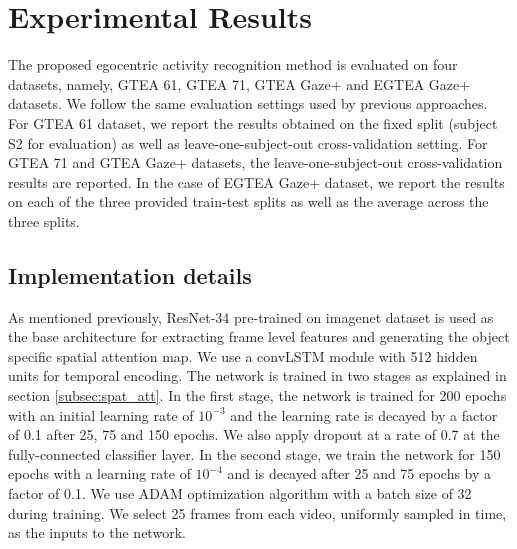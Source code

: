 \documentclass{bmvc2k}
\begin{document}
\section{Experimental Results}
\label{sec:res}

The proposed egocentric activity recognition method is evaluated on four datasets, namely, GTEA 61, GTEA 71, GTEA Gaze+ and EGTEA Gaze+ datasets. We follow the same evaluation settings used by previous approaches. For GTEA 61 dataset, we report the results obtained on the fixed split (subject S2 for evaluation) as well as leave-one-subject-out cross-validation setting. For GTEA 71 and GTEA Gaze+ datasets, the leave-one-subject-out cross-validation results are reported. In the case of EGTEA Gaze+ dataset, we report the results on each of the three provided train-test splits as well as the average across the three splits.

\subsection{Implementation details}
\label{subsec:impl_det}

As mentioned previously, ResNet-34 pre-trained on imagenet dataset is used as the base architecture for extracting frame level features and generating the object specific spatial attention map. We use a convLSTM module with 512 hidden units for temporal encoding. The network is trained in two stages as explained in section \ref{subsec:spat_att}. In the first stage, the network is trained for 200 epochs with an initial learning rate of $10^{-3}$ and the learning rate is decayed by a factor of 0.1 after 25, 75 and 150 epochs. We also apply dropout at a rate of 0.7 at the fully-connected classifier layer. In the second stage, we train the network for 150 epochs with a learning rate of $10^{-4}$ and is decayed after 25 and 75 epochs by a factor of 0.1. We use ADAM optimization algorithm with a batch size of 32 during training. We select 25 frames from each video, uniformly sampled in time, as the inputs to the network.
\end{document}
